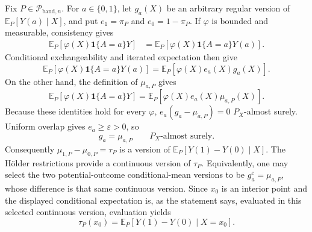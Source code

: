 Fix \(P\in\mathcal P_{\mathrm{band},n}\).  For \(a\in\{0,1\}\), let
\(g_a(X)\) be an arbitrary regular version of
\(\mathbb E_P[Y(a)\mid X]\), and put \(e_1=\pi_P\) and
\(e_0=1-\pi_P\).  If \(\varphi\) is bounded and measurable, consistency gives
\[
\begin{aligned}
\mathbb E_P[\varphi(X)\mathbf 1\{A=a\}Y]
&=\mathbb E_P[\varphi(X)\mathbf 1\{A=a\}Y(a)] .
\end{aligned}
\]
Conditional exchangeability and iterated expectation then give
\[
\mathbb E_P[\varphi(X)\mathbf 1\{A=a\}Y(a)]
=\mathbb E_P[\varphi(X)e_a(X)g_a(X)].
\]
On the other hand, the definition of \(\mu_{a,P}\) gives
\[
\mathbb E_P[\varphi(X)\mathbf 1\{A=a\}Y]
=\mathbb E_P[\varphi(X)e_a(X)\mu_{a,P}(X)].
\]
Because these identities hold for every \(\varphi\),
\(e_a(g_a-\mu_{a,P})=0\) \(P_X\)-almost surely.  Uniform overlap gives
\(e_a\geq\varepsilon>0\), so
\[
g_a=\mu_{a,P}\qquad P_X\text{-almost surely}.
\]
Consequently \(\mu_{1,P}-\mu_{0,P}=\tau_P\) is a version of
\(\mathbb E_P[Y(1)-Y(0)\mid X]\).  The H\"older restrictions provide a
continuous version of \(\tau_P\).  Equivalently, one may select the two
potential-outcome conditional-mean versions to be
\(g_a^{\mathrm c}=\mu_{a,P}\), whose difference is that same continuous
version.  Since \(x_0\) is an interior point and the displayed conditional
expectation is, as the statement says, evaluated in this selected continuous
version, evaluation yields
\[
\tau_P(x_0)=\mathbb E_P[Y(1)-Y(0)\mid X=x_0].
\]
